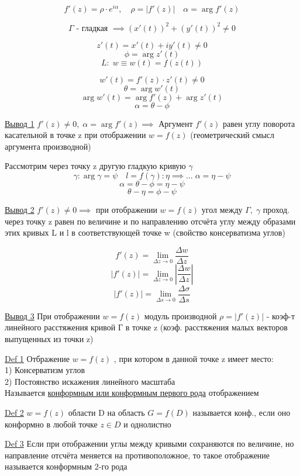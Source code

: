 \documentclass[a4paper]{article}
\begin{document}
\[
    f'(z) = \rho \cdot e^{i\alpha}, \quad \rho = |f'(z)| \quad \alpha = \arg f'(z)
\]

\[
    \Gamma \text{ - гладкая } \implies (x'(t))^2 + (y'(t))^2 \neq 0
\]

\[
    z'(t) = x'(t) + iy'(t) \neq 0
\]
\[
    \phi = \arg z'(t)
\]
\[
    L: \; w \equiv w(t) = f(z(t))
\]

\[
    w'(t) = f'(z) \cdot z'(t) \neq 0
\]
\[
    \theta = \arg w'(t)
\]
\[
    \arg w'(t) = \arg f'(z) + \arg z'(t)
\]
\[
    \alpha = \theta - \phi
\]

\underline{Вывод 1} $ f'(z) \neq 0, \; \alpha = \arg f'(z) \implies $ Аргумент $ f'(z) $ 
равен углу поворота касательной в точке z при отображении $ w = f(z) $ (геометрический
смысл аргумента производной)

Рассмотрим через точку z другую гладкую кривую $ \gamma $ \\
\[
    \gamma: \arg\gamma = \psi \quad l = f(\gamma): \eta \implies \dots 
    \; \alpha = \eta - \psi
\]
\[
    \alpha = \theta - \phi = \eta - \psi
\]
\[
    \theta - \eta = \phi - \psi
\]

\underline{Вывод 2} $ f'(z) \neq 0 \implies $ при отображении $ w = f(z) $ 
угол между $ \Gamma, \; \gamma $ проход. через точку z равен по величине и 
по направлению отсчёта углу между образами этих кривых L и l в соответствующей точке w
(свойство консерватизма углов)

\[
    f'(z) = \lim_{\Delta z \to 0} \frac{\Delta w}{\Delta z} 
\]
\[
    |f'(z)| = \lim_{\Delta z \to 0} \left|\frac{\Delta w}{\Delta z} \right|
\]
\[
    |f'(z)| = \lim_{\Delta s \to 0} \frac{\Delta \sigma}{\Delta s} 
\]

\underline{Вывод 3} При отображении $ w = f(z) $ модуль производной $ \rho = |f'(z)| $ 
- коэф-т линейного расстяжения кривой Г в точке z (коэф. расстяжения малых векторов
выпущенных из точки z)

\underline{Def 1} Отбражение $ w = f(z) $ , при котором в данной точке z имеет место:\\
1) Консерватизм углов \\
2) Постоянство искажения линейного масштаба\\
Называется \underline{конформным или конформным первого рода} отображением

\underline{Def 2} $ w = f(z) $ области D на область $ G = f(D) $ называется конф., если
оно конформно в любой точке $ z \in D $ и однолистно

\underline{Def 3} Если при отображении углы между кривыми сохраняются по величине, но
направление отсчёта меняется на противоположное, то такое отображение называется
конформным 2-го рода
\end{document}
